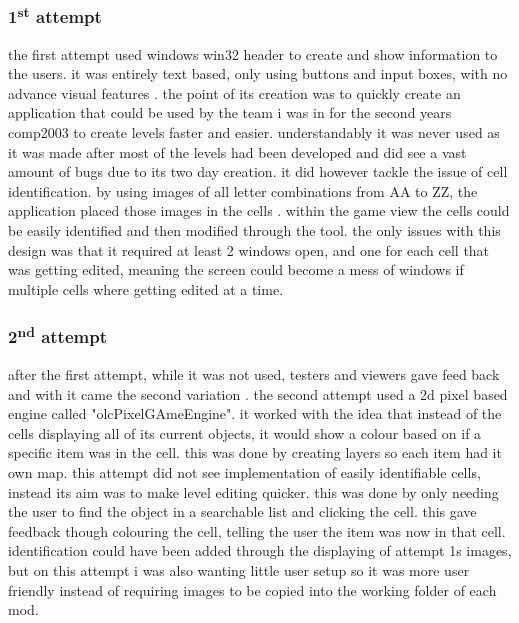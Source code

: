 \subsubsection{1\textsuperscript{st} attempt}
the first attempt\cite{_2024_leveleditor} used windows win32 header to create and show information to the users. it was entirely text based, only using buttons and input boxes, with no advance visual features . the point of its creation was to quickly create an application that could be used by the team i was in for the second years comp2003 to create levels faster and easier. understandably it was never used as it was made after most of the levels had been developed and did see a vast amount of bugs due to its two day creation. 
it did however tackle the issue of cell identification. by using images of all letter combinations from AA to ZZ, the application placed those images in the cells . within the game view the cells could be easily identified and then modified through the tool. the only issues with this design was that it required at least 2 windows open, and one for each cell that was getting edited, meaning the screen could become a mess of windows if multiple cells where getting edited at a time.

\subsubsection{2\textsuperscript{nd} attempt}
after the first attempt, while it was not used, testers and viewers gave feed back and with it came the second variation\cite{ozzyking_2024_github}  . the second attempt used a 2d pixel based engine called "olcPixelGAmeEngine". it worked with the idea that instead of the cells displaying all of its current objects, it would show a colour based on if a specific item was in the cell. this was done by creating layers so each item had it own map.
this attempt did not see implementation of easily identifiable cells, instead its aim was to make level editing quicker. this was done by only needing the user to find the object in a searchable list and clicking the cell. this gave feedback though colouring the cell, telling the user the item was now in that cell. identification could have been added through the displaying of attempt 1s images, but on this attempt i was also wanting little user setup so it was more user friendly instead of requiring images to be copied into the working folder of each mod.

